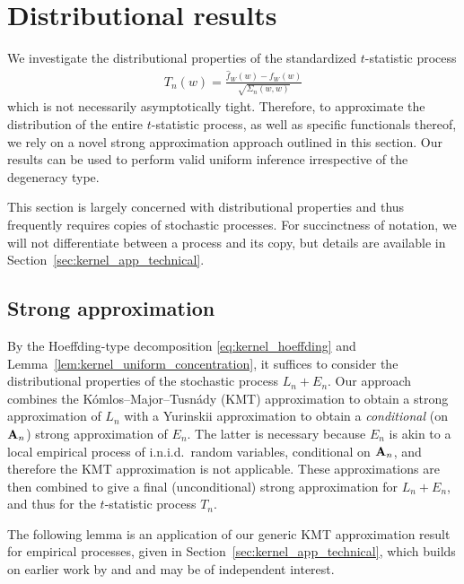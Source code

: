 \section{Distributional results}
\label{sec:kernel_inference}

We investigate the distributional properties of the
standardized $t$-statistic process
%
\begin{align*}
  T_n(w) = \frac{\hat{f}_W(w) - f_W(w)}{\sqrt{\Sigma_n(w,w)}}
\end{align*}
%
which is not necessarily asymptotically tight. Therefore, to approximate the
distribution of the entire $t$-statistic process, as well as specific
functionals thereof, we rely on a novel strong approximation approach outlined
in this section. Our results can be used to perform valid uniform inference
irrespective of the degeneracy type.

This section is largely concerned with distributional properties and thus
frequently requires copies of stochastic processes. For succinctness of
notation, we will not differentiate between a process and its copy, but details
are available in Section~\ref{sec:kernel_app_technical}.

\subsection{Strong approximation}

By the Hoeffding-type decomposition \eqref{eq:kernel_hoeffding} and
Lemma~\ref{lem:kernel_uniform_concentration}, it suffices to consider the
distributional properties of the stochastic process $L_n + E_n$.
Our approach combines the K{\'o}mlos--Major--Tusn{\'a}dy (KMT) approximation
\citep{komlos1975approximation} to obtain a strong approximation of $L_n$ with
a Yurinskii approximation \citep{yurinskii1978error} to obtain a
\emph{conditional} (on $\mathbf{A}_n$) strong approximation of $E_n$. The latter is
necessary because $E_n$ is akin to a local empirical process of i.n.i.d.\
random variables, conditional on $\mathbf{A}_n$, and therefore the KMT approximation
is not applicable. These approximations are then combined to give a final
(unconditional) strong approximation for $L_n+E_n$, and thus for the
$t$-statistic process $T_n$.

The following lemma is an application of our generic KMT approximation result
for empirical processes, given in Section~\ref{sec:kernel_app_technical}, which
builds on earlier work by \citet{gine2004kernel} and \citet{gine2010confidence}
and may be of independent interest.

